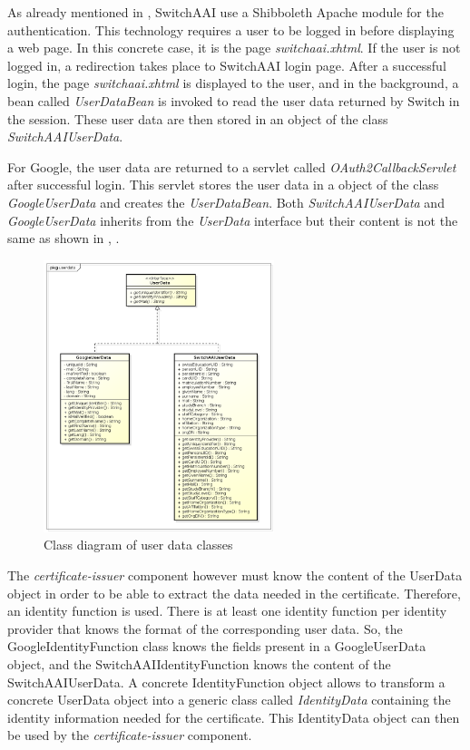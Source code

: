\documentclass[oneside]{scrreprt}
\begin{document}
As already mentioned in , SwitchAAI use a Shibboleth Apache module for the authentication. This technology requires a user to be logged in before displaying a web page. In this concrete case, it is the page \textit{switchaai.xhtml}. If the user is not logged in, a redirection takes place to SwitchAAI login page. After a successful login, the page \textit{switchaai.xhtml} is displayed to the user, and in the background, a bean called \textit{UserDataBean} is invoked to read the user data returned by Switch in the session. These user data are then stored in an object of the class \textit{SwitchAAIUserData}.

For Google, the user data are returned to a servlet called \textit{OAuth2CallbackServlet} after successful login. This servlet stores the user data in a object of the class \textit{GoogleUserData} and creates the \textit{UserDataBean}. Both \textit{SwitchAAIUserData} and \textit{GoogleUserData} inherits from the \textit{UserData} interface but their content is not the same as shown in , .

\begin{figure}[ht]
\centerline{
\includegraphics[width=0.6\textwidth]{figs/userdata_class_diagram.png}}
\caption{Class diagram of user data classes}
\label{fig:userdata}
\end{figure}

The \textit{certificate-issuer} component however must know the content of the UserData object in order to be able to extract the data needed in the certificate. Therefore, an identity function is used. There is at least one identity function per identity provider that knows the format of the corresponding user data. So, the GoogleIdentityFunction class knows the fields present in a GoogleUserData object, and the SwitchAAIIdentityFunction knows the content of the SwitchAAIUserData. A concrete IdentityFunction object allows to transform a concrete UserData object into a generic class called \textit{IdentityData} containing the identity information needed for the certificate. This IdentityData object can then be used by the \textit{certificate-issuer} component.
\end{document}
